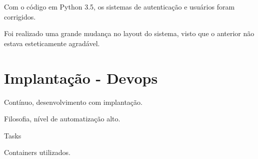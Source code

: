 Com o código em Python 3.5, os sistemas de autenticação e usuários foram corrigidos.

Foi realizado uma grande mudança no layout do sistema, visto que o anterior não estava esteticamente agradável.



\section{Implantação - Devops}
Contínuo, desenvolvimento com implantação.

Filosofia, nível de automatização alto.

Tasks

Containers utilizados.

